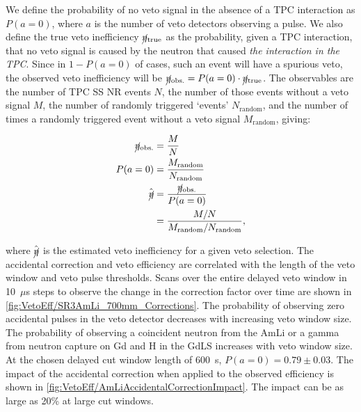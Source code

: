 We define the probability of no veto signal in the absence of a TPC interaction as $P(a=0)$, where $a$ is the number of veto detectors observing a pulse. We also define the true veto inefficiency $\cancel\eta_\text{true}$ as the probability, given a TPC interaction, that no veto signal is caused by the neutron that caused \emph{the interaction in the TPC}. Since in $1-P(a=0)$ of cases, such an event will have a spurious veto, the observed veto inefficiency will be $\cancel\eta_\text{obs.}=P(a=0)\cdot\cancel\eta_\text{true}$. The observables are the number of TPC SS NR events $N$, the number of those events without a veto signal $M$, the number of randomly triggered `events' $N_\text{random}$, and the number of times a randomly triggered event without a veto signal $M_\text{random}$, giving:

\begin{align}
    \cancel\eta_\text{obs.}&=\frac{M}{N}\\
    P(a=0)&=\frac{M_\text{random}}{N_\text{random}}\\
    \hat{\cancel\eta}&=\frac{\cancel\eta_\text{obs.}}{P(a=0)}\\
    &=\frac{M/N}{M_\text{random}/N_\text{random}},
\end{align}

where $\hat{\cancel\eta}$ is the estimated veto inefficiency for a given veto selection. The accidental correction and veto efficiency are correlated with the length of the veto window and veto pulse thresholds. Scans over the entire delayed veto window in 10~$\mu$s steps to observe the change in the correction factor over time are shown in \autoref{fig:VetoEff/SR3AmLi_700mm_Corrections}. The probability of observing zero accidental pulses in the veto detector decreases with increasing veto window size. The probability of observing a coincident neutron from the AmLi or a gamma from neutron capture on Gd and H in the GdLS increases with veto window size. At the chosen delayed cut window length of 600~\textmu s, $P(a=0)=0.79\pm0.03$. 
The impact of the accidental correction when applied to the observed efficiency is shown in \autoref{fig:VetoEff/AmLiAccidentalCorrectionImpact}. The impact can be as large as 20\% at large cut windows.

